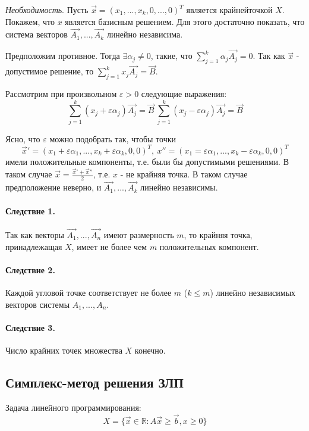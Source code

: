 \documentclass[a4paper, 14pt]{extarticle}
\numberwithin{equation}{section}
\begin{document}
\textit{Необходимость}. Пусть $\vec{x} = (x_1, ..., x_k, 0, ..., 0)^T $ является крайнейточкой $X$. Покажем, что $x$ является базисным решением. Для этого достаточно показать, что система векторов $\vec{A_1}, ..., \vec{A_k}$ линейно независима.

Предположим противное. Тогда $\exists \alpha_j \ne 0$, такие, что $\sum\limits_{j=1}^k \alpha_j \vec{A_j} = 0$. Так как $\vec{x}$ - допустимое решение, то $ \sum\limits^{k}_{j=1} x_j \vec{A_j} = \vec{B} $. 

Рассмотрим при произвольном $\varepsilon > 0$ следующие выражения: 
\[ \sum^{k}_{j=1} (x_j + \varepsilon \alpha_j) \vec{A_j} = \vec{B} \
\sum^{k}_{j=1} (x_j - \varepsilon \alpha_j) \vec{A_j} = \vec{B} \]

Ясно, что $\varepsilon$ можно подобрать так, чтобы точки 
\[ \vec{x}' = (x_1 + \varepsilon \alpha_1, ..., x_k + \varepsilon \alpha_k, 0, 0)^T, \ 
x''=(x_1 = \varepsilon \alpha_1, ..., x_k - \varepsilon \alpha_k, 0, 0)^T\]
имели положительные компоненты, т.е. были бы допустимыми решениями. В таком случае
$ \vec{x} = \frac{\vec{x}'+\vec{x}''}{2}$, т.е. $x$ - не крайняя точка. В таком случае предположение неверно, и $ \vec{A_1}, ..., \vec{A_k} $ линейно независимы.

\paragraph{Следствие 1.} Так как векторы $ \vec{A_1}, ..., \vec{A_n}$ имеют размерность $m$, то крайняя точка, принадлежащая $X$, имеет не более чем $m$ положительных компонент.

\paragraph{Следствие 2.} Каждой угловой точке соответствует не более $m$ ($k \le m$) линейно независимых векторов системы $A_1, ..., A_n$. 

\paragraph{Следствие 3.} Число крайних точек множества $X$ конечно.

\subsection{Симплекс-метод решения ЗЛП}
Задача линейного программирования:
\begin{equation}
    \label{eq:simplex:task}
    X = \{ \vec{x} \in \mathbb{R} : A \vec{x} \ge \vec{b}, x \ge 0 \}
\end{equation}
\end{document}
